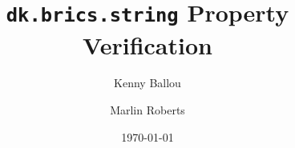 \documentclass[letterpaper,11pt,acmtog]{acmart}
\title{\texttt{dk.brics.string} Property Verification}
\date{\today}
\author{Kenny Ballou}
\affiliation{%
  \institution{Boise State University}
}
\author{Marlin Roberts}
\affiliation{%
  \institution{Boise State University}
}
\begin{document}
\maketitle{}

\nocite{*}


\end{document}
